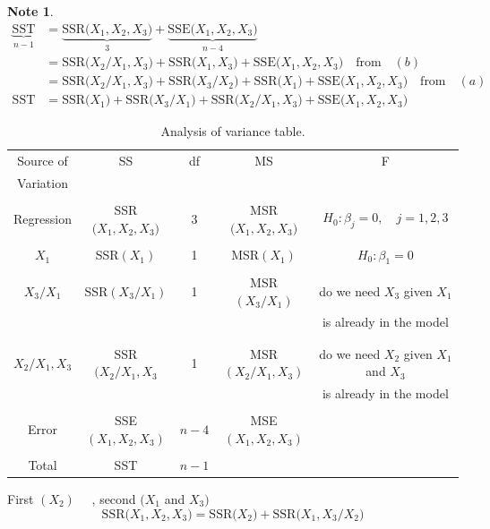 \documentclass[11pt,a4paper]{article}
\theoremstyle{definition}
\newtheorem*{note}{Note}
\begin{document}
\begin{note}
\begin{align*}
\underbrace{\text{SST}}_{n-1} & = \underbrace{\text{SSR}\big(X_1,X_2,X_3\big)}_3+\underbrace{\text{SSE}\big(X_1,X_2,X_3\big)}_{n-4}\\
                              & = \text{SSR}\big(X_2/X_1,X_3\big)+\text{SSR}\big(X_1,X_3\big)+\text{SSE}\big(X_1,X_2,X_3\big)\quad  \text{from}\quad  (b)\\
                              & = \text{SSR}\big(X_2/X_1,X_3\big)+\text{SSR}\big(X_3/X_2\big)+\text{SSR}\big(X_1\big)+\text{SSE}\big(X_1,X_2,X_3\big)\quad \text{from}\quad  (a)\\
            \text{SST} & = \text{SSR}\big(X_1\big)+\text{SSR}\big(X_3/X_1\big)+\text{SSR}\big(X_2/X_1,X_3\big)+\text{SSE}\big(X_1,X_2,X_3\big)
\end{align*}


\begin{table}[H]
\centering
\begin{tabular}{|c|c|c|c|c|}
\hline
Source of & SS & df & MS & F\\
Variation &    &    &    &\\
\hline
&&&&\\
Regression & SSR$\big(X_1,X_2,X_3\big)$ & 3 & MSR$\big(X_1,X_2,X_3\big)$ & $H_0:\beta_j=0,\quad  j=1,2,3$\\
&&&&\\
$X_1$ & SSR$(X_1)$ & 1 & MSR$(X_1)$ & $H_0:\beta_1=0$ \\
&&&&\\
$X_3/X_1$ & SSR$(X_3/X_1)$ & 1 & MSR$(X_3/X_1)$ & do we need $X_3$ given $X_1$ \\
&&&& is already in the model\\
&&&&\\
&&&&\\
$X_2/X_1,X_3$ & SSR$(X_2/X_1,X_3$ & 1 & MSR$(X_2/X_1,X_3)$ & do we need $X_2$ given $X_1$ and $X_3$\\
&&&& is already in the model\\
&&&&\\
Error & SSE$(X_1,X_2,X_3)$ & $n-4$ & MSE$(X_1,X_2,X_3)$ &\\
&&&&\\
Total & SST & $n-1$ &&\\
\hline
\end{tabular}
\caption{Analysis of variance table.}
\end{table}

First $(X_2)$ $\quad $, second $(X_1$ and $X_3)$
$$\text{SSR}\big(X_1,X_2,X_3\big) = \text{SSR}\big(X_2\big) + \text{SSR}\big(X_1,X_3/X_2\big)$$
\end{note}
\end{document}
